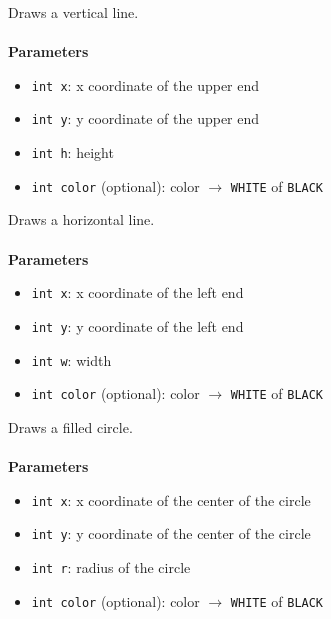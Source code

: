 \documentclass[11pt,fleqn]{book} %
\begin{document}
\begin{libf}[drawFastVLine(x, y, h, \emph{color=WHITE})]
	Draws a vertical line.\\ \\
	\textbf{Parameters}
	\begin{itemize}
		\item \texttt{int x}: x coordinate of the upper end
		\item \texttt{int y}: y coordinate of the upper end
		\item \texttt{int h}: height
		\item \texttt{int color} (optional): color $\rightarrow$ \texttt{WHITE} of \texttt{BLACK}
	\end{itemize}
\end{libf}

\begin{libf}[drawFastHLine(x, y, w, \emph{color=WHITE})]
	Draws a horizontal line.\\ \\
	\textbf{Parameters}
	\begin{itemize}
		\item \texttt{int x}: x coordinate of the left end
		\item \texttt{int y}: y coordinate of the left end
		\item \texttt{int w}: width
		\item \texttt{int color} (optional): color $\rightarrow$ \texttt{WHITE} of \texttt{BLACK}
	\end{itemize}
\end{libf}

\begin{libf}[fillCircle(x, y, r, \emph{color=WHITE})]
	Draws a filled circle.\\ \\
	\textbf{Parameters}
	\begin{itemize}
		\item \texttt{int x}: x coordinate of the center of the circle
		\item \texttt{int y}: y coordinate of the center of the circle
		\item \texttt{int r}: radius of the circle
		\item \texttt{int color} (optional): color $\rightarrow$ \texttt{WHITE} of \texttt{BLACK}
	\end{itemize}
\end{libf}
\end{document}

